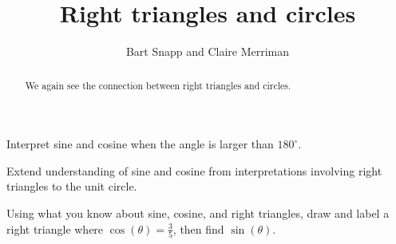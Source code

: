 \documentclass[noauthor,nooutcomes,handout]{ximera}
\title{Right triangles and circles}
\author{Bart Snapp and Claire Merriman}
\begin{document}
\begin{abstract}
  We again see the connection between right triangles and circles. 
\end{abstract}
\maketitle




\begin{listOutcomes}
\item Interpret sine and cosine when the angle is larger than $180^\circ$.
\item Extend understanding of sine and cosine from interpretations
  involving right triangles to the unit circle.
\end{listOutcomes}


\mynewpage


\begin{question}
 Using what you know about sine, cosine, and right triangles, draw and label a right triangle where $\cos(\theta)=\frac{3}{5}$, then find $\sin(\theta)$.
\end{question}
\mynewpage
\end{document}
